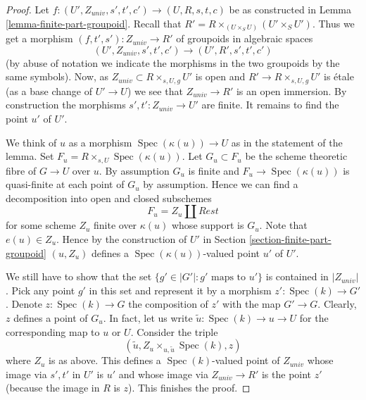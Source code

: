 \documentclass{stacks-project}
\theoremstyle{plain}
\theoremstyle{definition}
\theoremstyle{remark}
\numberwithin{equation}{subsection}
\def\Spec{\mathop{\mathrm{Spec}}}
\begin{document}
\begin{proof}
Let $f : (U', Z_{univ}, s', t', c') \to (U, R, s, t, c)$ be as constructed in
Lemma \ref{lemma-finite-part-groupoid}.
Recall that $R' = R \times_{(U \times_S U)} (U' \times_S U')$.
Thus we get a morphism $(f, t', s') : Z_{univ} \to R'$ of groupoids
in algebraic spaces
$$
(U', Z_{univ}, s', t', c') \to (U', R', s', t', c')
$$
(by abuse of notation we indicate the morphisms in the two groupoids
by the same symbols). Now, as $Z_{univ} \subset R \times_{s, U, g} U'$ is open
and $R' \to R \times_{s, U, g} U'$ is \'etale (as a base change
of $U' \to U$) we see that $Z_{univ} \to R'$ is an open immersion.
By construction the morphisms $s', t' : Z_{univ} \to U'$ are finite.
It remains to find the point $u'$ of $U'$.

\medskip\noindent
We think of $u$ as a morphism $\Spec(\kappa(u)) \to U$ as in
the statement of the lemma. Set $F_u = R \times_{s, U} \Spec(\kappa(u))$.
Let $G_u \subset F_u$ be the scheme theoretic fibre of $G \to U$ over $u$.
By assumption $G_u$ is finite and $F_u \to \Spec(\kappa(u))$
is quasi-finite at each point of $G_u$ by assumption.
Hence we can find a decomposition into open and closed subschemes
$$
F_u = Z_u \amalg Rest
$$
for some scheme $Z_u$ finite over $\kappa(u)$ whose support is $G_u$.
Note that $e(u) \in Z_u$. Hence by the construction of $U'$ in
Section \ref{section-finite-part-groupoid}
$(u, Z_u)$ defines a $\Spec(\kappa(u))$-valued
point $u'$ of $U'$.

\medskip\noindent
We still have to show that the set $\{g' \in |G'| : g'\text{ maps to }u'\}$
is contained in $|Z_{univ}|$. Pick any point $g'$ in this set and
represent it by a morphism $z' : \Spec(k) \to G'$. Denote
$z : \Spec(k) \to G$ the composition of $z'$ with the map $G' \to G$.
Clearly, $z$ defines a point of $G_u$. In fact, let us write
$\tilde u : \Spec(k) \to u \to U$ for the corresponding map to $u$ or $U$.
Consider the triple
$$
(\tilde u, Z_u \times_{u, \tilde u} \Spec(k), z)
$$
where $Z_u$ is as above. This defines a $\Spec(k)$-valued point
of $Z_{univ}$ whose image via $s', t'$ in $U'$ is $u'$ and
whose image via $Z_{univ} \to R'$ is the point $z'$
(because the image in $R$ is $z$).
This finishes the proof.
\end{proof}
\end{document}
